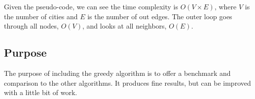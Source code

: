 \documentclass[12pt]{report}
\begin{document}
\begin{multicols}{2}
    Given the pseudo-code, we can see the time complexity is $O(V \times E)$, where $V$ is the number of cities and $E$ is the number of out edges. The outer loop goes through all nodes, $O(V)$, and looks at all neighbors, $O(E)$.
    \subsection{Purpose}
    The purpose of including the greedy algorithm is to offer a benchmark and comparison to the other algorithms. It produces fine results, but can be improved with a little bit of work.
\end{multicols}
\end{document}
